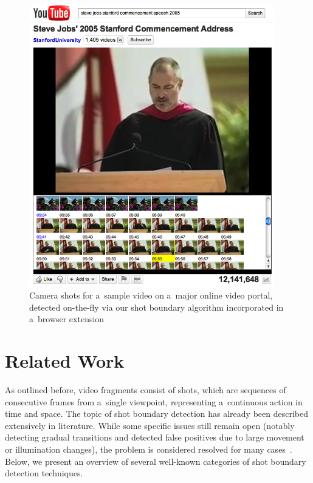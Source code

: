 \begin{figure}
\centering
    \includegraphics[width=0.95\textwidth,height=0.9\textheight,keepaspectratio]{./stevejobs.png}
  \caption[Camera shots for a~sample video on  
    a~major online video portal]
    {Camera shots for a~sample video on 
    a~major online video portal, detected on-the-fly via
    our shot boundary algorithm incorporated
    in a~browser extension}
  \label{fig:screenshotcamerashots}
\end{figure}

\section{Related Work} 

As outlined before, video fragments consist of shots, which are sequences of
consecutive frames from a~single viewpoint,
representing a~continuous action in time and space.
The topic of shot boundary detection has already been described
extensively in literature.
While some specific issues still remain open
(notably detecting gradual transitions and detected false positives
due to large movement or illumination changes),
the problem is considered resolved for many
cases~\cite{yuan2007shotboundary,hanjalic2002shotboundary}.
Below, we present an overview of several well-known categories of shot boundary detection techniques.

